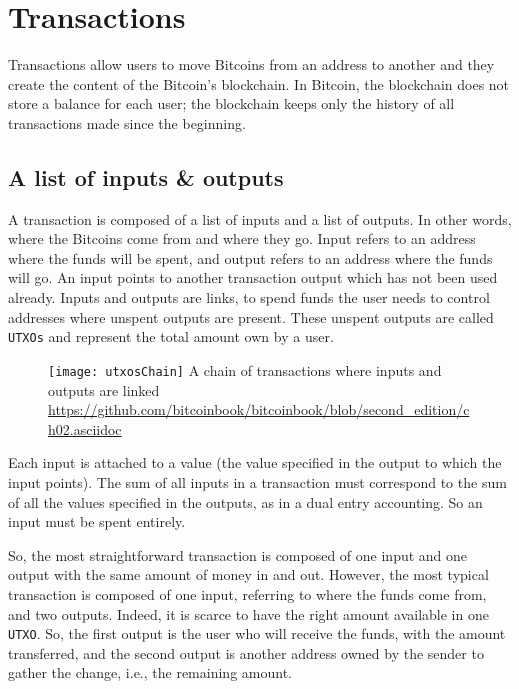 \section{Transactions}

Transactions allow users to move Bitcoins from an address to another and they
create the content of the Bitcoin's blockchain. In Bitcoin, the blockchain does
not store a balance for each user; the blockchain keeps only the history of all
transactions made since the beginning.

\subsection{A list of inputs \& outputs}

A transaction is composed of a list of inputs and a list of outputs. In other
words, where the Bitcoins come from and where they go. Input refers to an
address where the funds will be spent, and output refers to an address where the
funds will go. An input points to another transaction output which has not been
used already. Inputs and outputs are links, to spend funds the user needs to
control addresses where unspent outputs are present. These unspent outputs are
called \texttt{UTXOs} and represent the total amount own by a user.

\begin{figure}[H]
	\centering
	\texttt{[image: utxosChain]}
  {A chain of transactions where inputs and outputs are linked}
	{\url{https://github.com/bitcoinbook/bitcoinbook/blob/second_edition/ch02.asciidoc}}
	\label{fig:utxosChain}
\end{figure}

Each input is attached to a value (the value specified in the output to which
the input points). The sum of all inputs in a transaction must correspond to the
sum of all the values specified in the outputs, as in a dual entry accounting.
So an input must be spent entirely.

So, the most straightforward transaction is composed of one input and one output
with the same amount of money in and out. However, the most typical transaction
is composed of one input, referring to where the funds come from, and two
outputs. Indeed, it is scarce to have the right amount available in one
\texttt{UTXO}. So, the first output is the user who will receive the funds, with
the amount transferred, and the second output is another address owned by the
sender to gather the change, i.e., the remaining amount.

